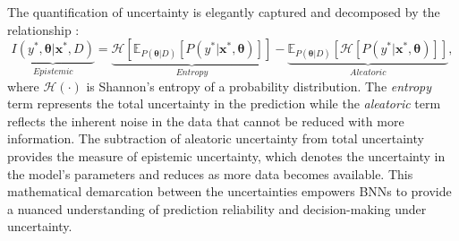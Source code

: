 The quantification of uncertainty is elegantly captured and decomposed by the relationship \cite{depeweg2018decomposition}:
\begin{equation}
\label{eq:Bayes_AU_EU_decomp}
    \underbrace{I(y^*, \boldsymbol{\theta} | \mathbf{x}^*, D)}_{Epistemic} = \underbrace{\mathcal{H}\left[ \mathbb{E}_{P(\boldsymbol{\theta}|D)}\left[P(y^*|\mathbf{x}^*, \boldsymbol{\theta})\right]\right]}_{Entropy} - \underbrace{\mathbb{E}_{P(\boldsymbol{\theta}|D)}\left[\mathcal{H}\left[P(y^*|\mathbf{x}^*, \boldsymbol{\theta})\right]\right]}_{Aleatoric},
\end{equation}
where $\mathcal{H}(\cdot)$ is Shannon’s entropy of a probability distribution.
The \textit{entropy} term represents the total uncertainty in the prediction while the \textit{aleatoric} term reflects the inherent noise in the data that cannot be reduced with more information. 
The subtraction of aleatoric uncertainty from total uncertainty provides the measure of epistemic uncertainty, which denotes the uncertainty in the model's parameters and reduces as more data becomes available. 
This mathematical demarcation between the uncertainties empowers BNNs to provide a nuanced understanding of prediction reliability and decision-making under uncertainty.


